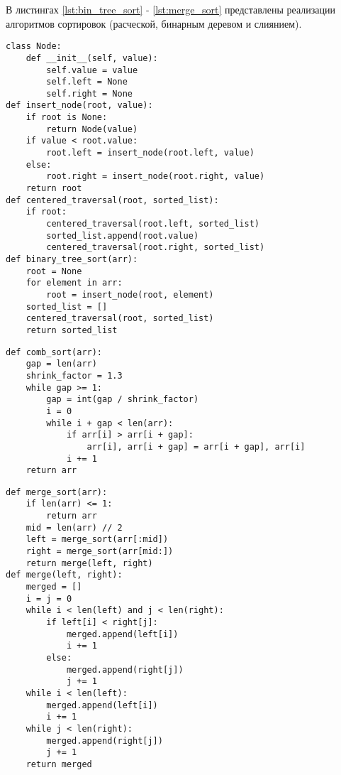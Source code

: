 В листингах \ref{lst:bin_tree_sort} - \ref{lst:merge_sort} представлены реализации алгоритмов сортировок (расческой, бинарным деревом и слиянием).

\begin{center}
\captionsetup{justification=raggedright,singlelinecheck=off}
	\begin{lstlisting}[label=lst:bin_tree_sort,caption=Алгоритм сортировки бинарным деревом]
class Node:
	def __init__(self, value):
		self.value = value
		self.left = None
		self.right = None
def insert_node(root, value):
	if root is None:
		return Node(value)
	if value < root.value:
		root.left = insert_node(root.left, value)
	else:
		root.right = insert_node(root.right, value)
	return root
def centered_traversal(root, sorted_list):
	if root:
		centered_traversal(root.left, sorted_list)
		sorted_list.append(root.value)
		centered_traversal(root.right, sorted_list)
def binary_tree_sort(arr):
	root = None
	for element in arr:
		root = insert_node(root, element)
	sorted_list = []
	centered_traversal(root, sorted_list)
	return sorted_list
	\end{lstlisting}
\end{center}
\clearpage
\begin{center}
	\captionsetup{justification=raggedright,singlelinecheck=off}
	\begin{lstlisting}[label=lst:comb_sort,caption=Алгоритм сортировки расческой]
def comb_sort(arr):
	gap = len(arr)
	shrink_factor = 1.3
	while gap >= 1:
		gap = int(gap / shrink_factor)
		i = 0
		while i + gap < len(arr):
			if arr[i] > arr[i + gap]:
				arr[i], arr[i + gap] = arr[i + gap], arr[i]
			i += 1
	return arr
	\end{lstlisting}
\end{center}

\begin{center}
\captionsetup{justification=raggedright,singlelinecheck=off}
	\begin{lstlisting}[label=lst:merge_sort,caption=Алгоритм сортировки слиянием]
def merge_sort(arr):
	if len(arr) <= 1:
		return arr
	mid = len(arr) // 2
	left = merge_sort(arr[:mid])
	right = merge_sort(arr[mid:])
	return merge(left, right)
def merge(left, right):
	merged = []
	i = j = 0
	while i < len(left) and j < len(right):
		if left[i] < right[j]:
			merged.append(left[i])
			i += 1
		else:
			merged.append(right[j])
			j += 1
	while i < len(left):
		merged.append(left[i])
		i += 1
	while j < len(right):
		merged.append(right[j])
		j += 1
	return merged
	\end{lstlisting}
\end{center}

